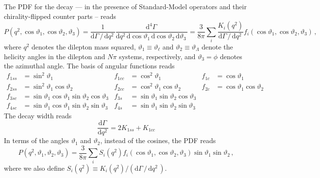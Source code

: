 \documentclass[aps,prd,reprint,nofootinbib,preprintnumbers]{revtex4}
\newcommand{\rmdx}[1]{\mbox{d} #1 \,} %
\renewcommand{\theta}{\vartheta}
\begin{document}
The PDF for the decay --- in the presence of Standard-Model operators and their chirality-flipped counter parts -- reads \cite{Boeer:2014xx}
\begin{equation}
    P(q^2, \cos\theta_1, \cos\theta_2, \theta_3) = \frac{1}{\rmdx{\Gamma} /\, \rmdx{q^2}} \frac{\rmdx{^4\Gamma}}{\rmdx{q^2} \rmdx{\cos\theta_1} \rmdx{\cos\theta_2} \rmdx{\theta_3}} = \frac{3}{8\pi} \sum_i \frac{K_{i}(q^2)}{\rmdx{\Gamma} /\, \rmdx{q^2}} f_i(\cos\theta_1, \cos\theta_2, \theta_3)\,,
\end{equation}
where $q^2$ denotes the dilepton mass squared, $\theta_1 \equiv \theta_\ell$ and $\theta_2 \equiv \theta_\Lambda$ denote the
helicity angles in the dilepton and
$N\pi$ systems, respectively, and $\theta_3 = \phi$ denotes the azimuthal angle.
The basis of angular functions reads \cite{Boeer:2014xx}
\begin{equation}
    \begin{aligned}
        f_{1ss} & = \sin^2\theta_1 &
        f_{1cc} & = \cos^2\theta_1 &
        f_{1c}  & = \cos\theta_1\\
        f_{2ss} & = \sin^2\theta_1 \cos\theta_2 &
        f_{2cc} & = \cos^2\theta_1 \cos\theta_2 &
        f_{2c}  & = \cos\theta_1   \cos\theta_2 \\
        f_{3sc} & = \sin\theta_1 \cos\theta_1 \sin\theta_2 \cos\theta_3 &
        f_{3s}  & = \sin\theta_1              \sin\theta_2 \cos\theta_3 \\
        f_{4sc} & = \sin\theta_1 \cos\theta_1 \sin\theta_2 \sin\theta_3 &
        f_{4s}  & = \sin\theta_1              \sin\theta_2 \sin\theta_3
    \end{aligned}
\end{equation}
The decay width reads
\begin{equation}
    \frac{\rmdx{\Gamma}} {\rmdx{q^2}} = 2 K_{1ss} + K_{1cc}
\end{equation}
In terms of the angles $\theta_1$ and $\theta_2$, instead of the cosines, the PDF reads
\begin{equation}
    P(q^2, \theta_1, \theta_2, \theta_3) = \frac{3}{8\pi} \sum_i S_i(q^2) f_i(\cos\theta_1, \cos\theta_2, \theta_3) \sin\theta_1 \sin\theta_2\,,
\end{equation}
where we also define $S_i(q^2) \equiv K_i(q^2) / (\rmdx{\Gamma} /\, \rmdx{q^2})$.\\
\end{document}
